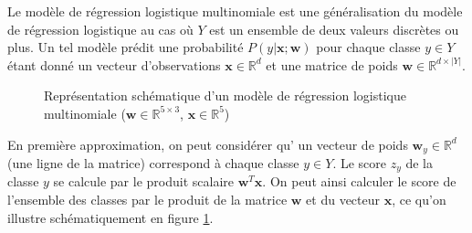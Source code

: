 \documentclass[11pt,openany]{book}
\begin{document}
Le modèle de régression logistique multinomiale est une généralisation
du modèle de régression logistique au cas où $Y$ est un ensemble de deux valeurs
discrètes ou plus. Un tel modèle prédit une probabilité
$P(y|\mathbf{x};\mathbf{w})$ pour chaque classe $y\in Y$ étant donné
un vecteur d'observations $\mathbf{x}\in \mathbb{R}^d$ et une matrice
de poids $\mathbf{w}\in \mathbb{R}^{d\times|Y|}$.

\begin{figure}[htbp]
\begin{center}
\caption{\label{fig-logistic-multinomial-schema}Représentation
schématique d'un modèle de régression
  logistique multinomiale ($\mathbf{w}\in\mathbb{R}^{5\times 3}$, $\mathbf{x}\in\mathbb{R}^5$)}
\end{center}
\end{figure}

En première approximation, on peut considérer qu'
un vecteur de poids $\mathbf{w}_y \in \mathbb{R}^d$ (une ligne de la
matrice) correspond à chaque classe $y\in Y$.
Le score $z_y$ de la classe $y$  se calcule par le produit scalaire $\mathbf{w}^T\mathbf{x}$.
On peut ainsi calculer le score de l'ensemble des classes par le
produit de la matrice $\mathbf{w}$ et du vecteur $\mathbf{x}$, ce qu'on illustre
schématiquement en figure \ref{fig-logistic-multinomial-schema}.
\end{document}
